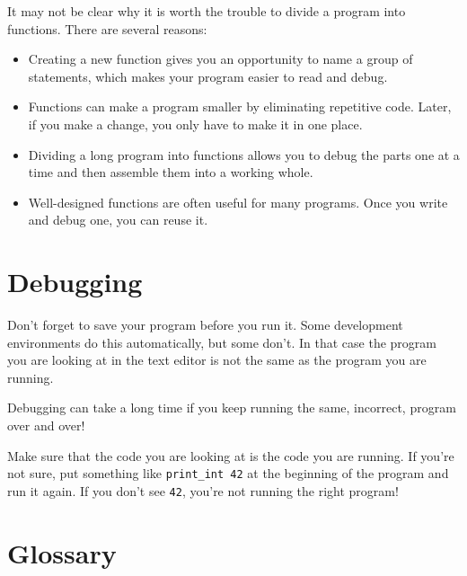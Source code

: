 \documentclass[10pt]{book}
\begin{document}
It may not be clear why it is worth the trouble to divide
a program into functions.  There are several reasons:

\begin{itemize}

\item Creating a new function gives you an opportunity to name a group
of statements, which makes your program easier to read and debug.

\item Functions can make a program smaller by eliminating repetitive
code.  Later, if you make a change, you only have
to make it in one place.

\item Dividing a long program into functions allows you to debug the
parts one at a time and then assemble them into a working whole.

\item Well-designed functions are often useful for many programs.
Once you write and debug one, you can reuse it.

\end{itemize}

\section{Debugging}
\label{editor}

Don't forget to save your program before you run it.  Some
development environments do this automatically, but some don't.
In that case the program you are looking at in the text editor
is not the same as the program you are running.

Debugging can take a long time if you keep running the same,
incorrect, program over and over!

Make sure that the code you are looking at is the code you are running.
If you're not sure, put something like {\tt print\_int 42} at the
beginning of the program and run it again.  If you don't see
{\tt 42}, you're not running the right program!


\section{Glossary}
\end{document}
